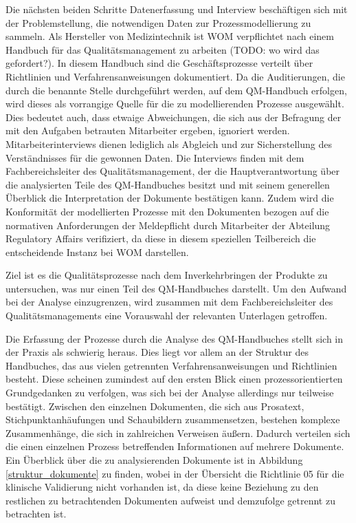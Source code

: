 \documentclass[a4paper,12pt]{report}
\begin{document}
Die nächsten beiden Schritte Datenerfassung und Interview beschäftigen sich mit der Problemstellung, die notwendigen Daten zur Prozessmodellierung zu sammeln. Als Hersteller von Medizintechnik ist WOM verpflichtet nach einem Handbuch für das Qualitätsmanagement zu arbeiten (TODO: wo wird das gefordert?). In diesem Handbuch sind die Geschäftsprozesse verteilt über Richtlinien und Verfahrensanweisungen dokumentiert. Da die Auditierungen, die durch die benannte Stelle durchgeführt werden, auf dem QM-Handbuch erfolgen, wird dieses als vorrangige Quelle für die zu modellierenden Prozesse ausgewählt. Dies bedeutet auch, dass etwaige Abweichungen, die sich aus der Befragung der mit den Aufgaben betrauten Mitarbeiter ergeben, ignoriert werden. Mitarbeiterinterviews dienen lediglich als Abgleich und zur Sicherstellung des Verständnisses für die gewonnen Daten. Die Interviews finden mit dem Fachbereichsleiter des Qualitätsmanagement, der die Hauptverantwortung über die analysierten Teile des QM-Handbuches besitzt und mit seinem generellen Überblick die Interpretation der Dokumente bestätigen kann. Zudem wird die Konformität der modellierten Prozesse mit den Dokumenten bezogen auf die normativen Anforderungen der Meldepflicht durch Mitarbeiter der Abteilung Regulatory Affairs verifiziert, da diese in diesem speziellen Teilbereich die entscheidende Instanz bei WOM darstellen.

Ziel ist es die Qualitätsprozesse nach dem Inverkehrbringen der Produkte zu untersuchen, was nur einen Teil des QM-Handbuches darstellt. Um den Aufwand bei der Analyse einzugrenzen, wird zusammen mit dem Fachbereichsleiter des Qualitätsmanagements eine Vorauswahl der relevanten Unterlagen getroffen.

Die Erfassung der Prozesse durch die Analyse des QM-Handbuches stellt sich in der Praxis als schwierig heraus. Dies liegt vor allem an der Struktur des Handbuches, das aus vielen getrennten Verfahrensanweisungen und Richtlinien besteht. Diese scheinen zumindest auf den ersten Blick einen prozessorientierten Grundgedanken zu verfolgen, was sich bei der Analyse allerdings nur teilweise bestätigt. Zwischen den einzelnen Dokumenten, die sich aus Prosatext, Stichpunktanhäufungen und Schaubildern zusammensetzen, bestehen komplexe Zusammenhänge, die sich in zahlreichen Verweisen äußern. Dadurch verteilen sich die einen einzelnen Prozess betreffenden Informationen auf mehrere Dokumente. Ein Überblick über die zu analysierenden Dokumente ist in Abbildung \ref{struktur_dokumente} zu finden, wobei in der Übersicht die Richtlinie 05 für die klinische Validierung nicht vorhanden ist, da diese keine Beziehung zu den restlichen zu betrachtenden Dokumenten aufweist und demzufolge getrennt zu betrachten ist.
\end{document}
